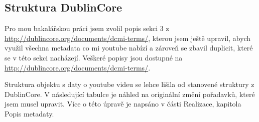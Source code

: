 \subsection{Struktura DublinCore}
\par Pro mou bakalářskou práci jsem zvolil popis sekci 3 z \url{http://dublincore.org/documents/dcmi-terms/}, kterou jsem ještě upravil, abych využil všechna metadata co mi youtube nabízí a zároveň se zbavil duplicit, které se v této sekci nacházejí. Veškeré popisy jsou dostupné na \url{http://dublincore.org/documents/dcmi-terms/}.
\par Struktura objektu s daty o youtube videu se lehce lišila od stanovené struktury z DublinCore\cite{dublincoredocementation}. V následující tabulce je náhled na originální změní pořadavků, které jsem musel upravit. Více o této úpravě je napsáno v části Realizace, kapitola Popis metadaty.
\hfill\vfill
